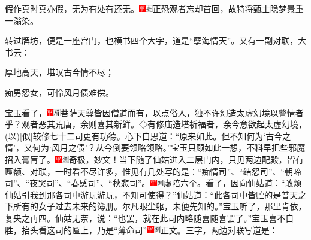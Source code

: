 假作真时真亦假，无为有处有还无。{{{\includegraphics[width=3mm]{../Images/00002}\includegraphics[width=3mm]{../Images/00012}\footnotesize \kaishu 正恐观者忘却首回，故特将甄士隐梦景重一}滃{染。}}}

转过牌坊，便是一座宫门，也横书四个大字，道是``孽海情天''。又有一副对联，大书云：

厚地高天，堪叹古今情不尽；

痴男怨女，可怜风月债难偿。

宝玉看了，{{\includegraphics[width=3mm]{../Images/00002}\includegraphics[width=3mm]{../Images/00010}\footnotesize \kaishu 菩萨天尊皆因僧道而有，以点俗人，独不许幻造太虚幻境以警情者乎？观者恶其荒唐，余则喜其新鲜。◇有修庙造塔祈福者，余今意欲起太虚幻境，{(以)}{[}似{]}较修七十二司更有功德。}}心下自思道：``原来如此。但不知何为`古今之情'，又何为`风月之债'？从今倒要领略领略。''宝玉只顾如此一想，不料早把些邪魔招入膏肓了。{\includegraphics[width=3mm]{../Images/00002}\includegraphics[width=3mm]{../Images/00011}\footnotesize \kaishu 奇极，妙文！}当下随了仙姑进入二层门内，只见两边配殿，皆有匾额、对联，一时看不尽许多，惟见有几处写的是：``痴情司''、``结怨司''、``朝啼司''、``夜哭司''、``春感司''、``秋悲司''。{\includegraphics[width=3mm]{../Images/00002}\includegraphics[width=3mm]{../Images/00011}\footnotesize \kaishu 虚陪六个。}看了，因向仙姑道：``敢烦仙姑引我到那各司中游玩游玩，不知可使得？''仙姑道：``此各司中皆贮的是普天之下所有的女子过去未来的簿册。尔凡眼尘躯，未便先知的。''宝玉听了，那里肯依，复央之再四。仙姑无奈，说：``也罢，就在此司内略随喜随喜罢了。''宝玉喜不自胜，抬头看这司的匾上，乃是``薄命司''{\includegraphics[width=3mm]{../Images/00002}\includegraphics[width=3mm]{../Images/00011}\footnotesize \kaishu 正文。}三字，两边对联写道是：

